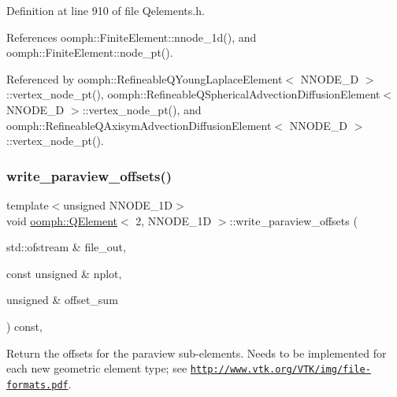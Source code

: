 Definition at line 910 of file Qelements.\+h.



References oomph\+::\+Finite\+Element\+::nnode\+\_\+1d(), and oomph\+::\+Finite\+Element\+::node\+\_\+pt().



Referenced by oomph\+::\+Refineable\+Q\+Young\+Laplace\+Element$<$ N\+N\+O\+D\+E\+\_\+D $>$\+::vertex\+\_\+node\+\_\+pt(), oomph\+::\+Refineable\+Q\+Spherical\+Advection\+Diffusion\+Element$<$ N\+N\+O\+D\+E\+\_\+D $>$\+::vertex\+\_\+node\+\_\+pt(), and oomph\+::\+Refineable\+Q\+Axisym\+Advection\+Diffusion\+Element$<$ N\+N\+O\+D\+E\+\_\+D $>$\+::vertex\+\_\+node\+\_\+pt().

\mbox{\label{classoomph_1_1QElement_3_012_00_01NNODE__1D_01_4_a624bb632d2e6385346a288bdc3edafca}} 
\subsubsection{\texorpdfstring{write\+\_\+paraview\+\_\+offsets()}{write\_paraview\_offsets()}}
{\footnotesize\ttfamily template$<$unsigned N\+N\+O\+D\+E\+\_\+1D$>$ \\
void \hyperlink{classoomph_1_1QElement}{oomph\+::\+Q\+Element}$<$ 2, N\+N\+O\+D\+E\+\_\+1D $>$\+::write\+\_\+paraview\+\_\+offsets (\begin{DoxyParamCaption}\item[{std\+::ofstream \&}]{file\+\_\+out,  }\item[{const unsigned \&}]{nplot,  }\item[{unsigned \&}]{offset\+\_\+sum }\end{DoxyParamCaption}) const\hspace{0.3cm}{\ttfamily [inline]}, {\ttfamily [virtual]}}



Return the offsets for the paraview sub-\/elements. Needs to be implemented for each new geometric element type; see \href{http://www.vtk.org/VTK/img/file-formats.pdf}{\tt http\+://www.\+vtk.\+org/\+V\+T\+K/img/file-\/formats.\+pdf}. 



